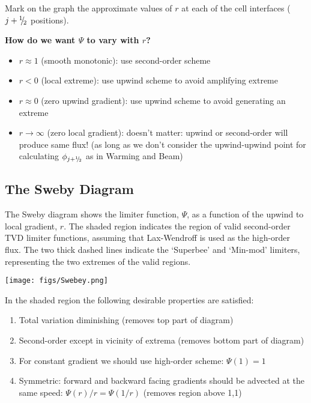 \begin{minipage}[t]{0.55\linewidth}
\raggedright
Mark on the graph the approximate values of $r$ at each of the cell interfaces ($j+{^1\negthickspace/\negthinspace_2}$ positions).
\\

\end{minipage}
\hfill
\begin{minipage}[t]{0.44\linewidth}
\centerline{\bf How do we want $\Psi$ to vary with $r$?\\}

\begin{itemize}\raggedright
\item $r\approx 1$ (smooth monotonic): use second-order scheme
\item $r< 0$ (local extreme): use upwind scheme to avoid amplifying extreme
\item $r\approx 0$ (zero upwind gradient): use upwind scheme to avoid generating an extreme
\item $r \rightarrow\infty$ (zero local gradient): doesn't matter: upwind or second-order will produce same flux! (as long as we don't consider the upwind-upwind point for calculating $\phi_{j+{^1\negthickspace/\negthinspace_2}}$ as in Warming and Beam)
\end{itemize}
\end{minipage}

\clearpage
\subsection{The Sweby Diagram}

The Sweby diagram shows the limiter function, $\Psi$, as a function of the upwind to local gradient, $r$. The shaded region indicates the region of valid second-order TVD limiter functions, assuming that Lax-Wendroff is used as the high-order flux. The two thick dashed lines indicate the ‘Superbee’ and ‘Min-mod’ limiters, representing the two extremes of the valid regions.

\begin{minipage}{0.45\linewidth}
\texttt{[image: figs/Swebey.png]}
\end{minipage}
\hfill
\begin{minipage}{0.52\linewidth}\raggedright

In the shaded region the following desirable properties are satisfied:

\begin{enumerate}\raggedright
\item Total variation diminishing (removes top part of diagram)
\item Second-order except in vicinity of extrema (removes bottom part of diagram)
\item For constant gradient we should use high-order scheme: $\Psi(1) = 1$
\item Symmetric: forward and backward facing gradients should be advected at the same speed: $\Psi(r)/r = \Psi(1/r)$ (removes region above 1,1)
\end{enumerate}
\end{minipage}

